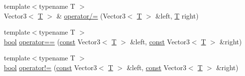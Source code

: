 \begin{DoxyCompactItemize}
\item 
{\footnotesize template$<$typename T $>$ }\\Vector3$<$ \hyperlink{curses_8priv_8h_a5ef253115820acf7d27f3c5c3b02a0f0}{T} $>$ \& \hyperlink{sfml_2dep_2_s_f_m_l-2_84_82_2include_2_s_f_m_l_2_system_2_vector3_8inl_a3c594d037661835b73f36aa05ad91936}{operator/=} (Vector3$<$ \hyperlink{curses_8priv_8h_a5ef253115820acf7d27f3c5c3b02a0f0}{T} $>$ \&left, \hyperlink{curses_8priv_8h_a5ef253115820acf7d27f3c5c3b02a0f0}{T} right)
\item 
{\footnotesize template$<$typename T $>$ }\\\hyperlink{term__entry_8h_a002004ba5d663f149f6c38064926abac}{bool} \hyperlink{sfml_2dep_2_s_f_m_l-2_84_82_2include_2_s_f_m_l_2_system_2_vector3_8inl_a388d72db973306a35ba467016b3dee30}{operator==} (\hyperlink{term__entry_8h_a57bd63ce7f9a353488880e3de6692d5a}{const} Vector3$<$ \hyperlink{curses_8priv_8h_a5ef253115820acf7d27f3c5c3b02a0f0}{T} $>$ \&left, \hyperlink{term__entry_8h_a57bd63ce7f9a353488880e3de6692d5a}{const} Vector3$<$ \hyperlink{curses_8priv_8h_a5ef253115820acf7d27f3c5c3b02a0f0}{T} $>$ \&right)
\item 
{\footnotesize template$<$typename T $>$ }\\\hyperlink{term__entry_8h_a002004ba5d663f149f6c38064926abac}{bool} \hyperlink{sfml_2dep_2_s_f_m_l-2_84_82_2include_2_s_f_m_l_2_system_2_vector3_8inl_a608500d1ad3b78082cb5bb4356742bd4}{operator!=} (\hyperlink{term__entry_8h_a57bd63ce7f9a353488880e3de6692d5a}{const} Vector3$<$ \hyperlink{curses_8priv_8h_a5ef253115820acf7d27f3c5c3b02a0f0}{T} $>$ \&left, \hyperlink{term__entry_8h_a57bd63ce7f9a353488880e3de6692d5a}{const} Vector3$<$ \hyperlink{curses_8priv_8h_a5ef253115820acf7d27f3c5c3b02a0f0}{T} $>$ \&right)
\end{DoxyCompactItemize}


